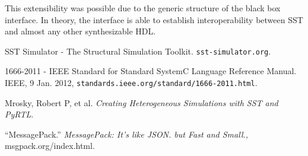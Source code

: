 \documentclass{article}
\begin{document}
    This extensibility was possible due to the generic structure of the black box interface. In
    theory, the interface is able to establish interoperability between SST and almost any other
    synthesizable HDL.


  \begin{thebibliography}{5}

     SST Simulator - The Structural Simulation Toolkit. \texttt{sst-simulator.org}.

     1666-2011 - IEEE Standard for Standard SystemC Language Reference Manual. IEEE, 9
    Jan. 2012, \texttt{standards.ieee.org/standard/1666-2011.html}.

     Mrosky, Robert P, et al.
    \textit{Creating Heterogeneous Simulations with SST and PyRTL}.

     ``MessagePack.'' \textit{MessagePack: It's like JSON. but Fast and Small.,}
    msgpack.org/index.html.

  \end{thebibliography}
\end{document}

